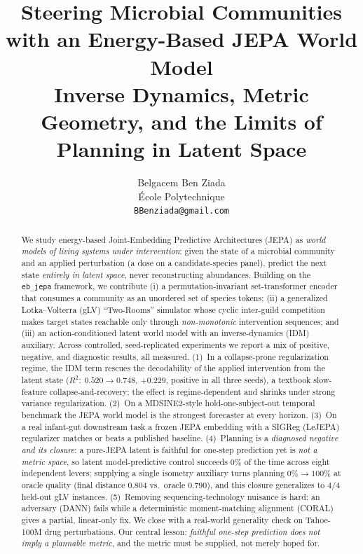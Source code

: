 \documentclass[11pt]{article}
\title{\textbf{Steering Microbial Communities with an Energy-Based JEPA
World Model}\\[2pt]
\large Inverse Dynamics, Metric Geometry, and the Limits of Planning in Latent Space}
\author{Belgacem Ben Ziada\\
\small École Polytechnique\\
\small \texttt{BBenziada@gmail.com}}
\date{}
\begin{document}
\maketitle

\begin{abstract}
We study energy-based Joint-Embedding Predictive Architectures (JEPA) as
\emph{world models of living systems under intervention}: given the state of a
microbial community and an applied perturbation (a dose on a candidate-species
panel), predict the next state \emph{entirely in latent space}, never
reconstructing abundances. Building on the \texttt{eb\_jepa} framework, we
contribute (i) a permutation-invariant set-transformer encoder that consumes a
community as an unordered set of species tokens; (ii) a generalized
Lotka--Volterra (gLV) ``Two-Rooms'' simulator whose cyclic inter-guild
competition makes target states reachable only through \emph{non-monotonic}
intervention sequences; and (iii) an action-conditioned latent world model with
an inverse-dynamics (IDM) auxiliary. Across controlled, seed-replicated
experiments we report a mix of positive, negative, and diagnostic results, all
measured. (1)~In a collapse-prone regularization regime, the IDM term rescues
the decodability of the applied intervention from the latent state
($R^2{:}~0.520\!\rightarrow\!0.748$, $+0.229$, positive in all three seeds),
a textbook slow-feature collapse-and-recovery; the effect is regime-dependent
and shrinks under strong variance regularization. (2)~On a MDSINE2-style
hold-one-subject-out temporal benchmark the JEPA world model is the strongest
forecaster at every horizon. (3)~On a real infant-gut downstream task a frozen
JEPA embedding with a SIGReg (LeJEPA) regularizer matches or beats a published
baseline. (4)~Planning is a \emph{diagnosed negative and its closure}: a
pure-JEPA latent is faithful for one-step prediction yet is \emph{not a metric
space}, so latent model-predictive control succeeds $0\%$ of the time across
eight independent levers; supplying a single isometry auxiliary turns planning
$0\%\!\rightarrow\!100\%$ at oracle quality (final distance $0.804$ vs.\ oracle
$0.790$), and this closure generalizes to $4/4$ held-out gLV instances.
(5)~Removing sequencing-technology nuisance is hard: an adversary (DANN) fails
while a deterministic moment-matching alignment (CORAL) gives a partial,
linear-only fix. We close with a real-world generality check on Tahoe-100M drug
perturbations. Our central lesson: \emph{faithful one-step prediction does not
imply a plannable metric}, and the metric must be supplied, not merely hoped
for.
\end{abstract}
\end{document}
